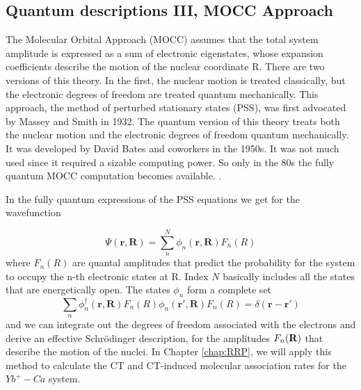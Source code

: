 \subsection{Quantum descriptions III, MOCC Approach}

The Molecular Orbital Approach (MOCC) assumes that the total system amplitude is expressed as a sum of electronic
eigenstates, whose expansion coefficients describe the motion of the nuclear coordinate R. There are two versions of
this theory. In the first, the nuclear motion is treated classically, but the electronic degrees of freedom are treated quantum mechanically. This approach, the method of perturbed stationary states (PSS), was first advocated by Massey and Smith in 1932.
The quantum version of this theory treats both the nuclear motion and the electronic degrees of freedom quantum mechanically. It was developed by David Bates and coworkers in the 1950s. It was not much used since it required a sizable computing power. So only in the 80s the fully quantum MOCC computation becomes available. \cite{ZygelmanCT}.

In the fully quantum expressions of the PSS equations we get for the wavefunction

\begin{equation}
  \Psi(\mathbf{r},\mathbf{R}) = \sum_n^N{\phi_n(\mathbf{r},\mathbf{R})F_n(R)}
\end{equation}
where $ F_n(R) $ are quantal amplitudes that predict the probability for the system to occupy the n-th electronic states
at R. Index $ N $ basically includes all the states that are energetically open.
The states $ \phi_n $ form a complete set
\begin{equation}
  \sum_n{\phi_n^{\dag}(\mathbf{r},\mathbf{R})F_n(R)\phi_n(\mathbf{r'},\mathbf{R})F_n(R)} = \delta(\mathbf{r} - \mathbf{r'})
\end{equation}
and we can integrate out the degrees of freedom associated with the electrons and derive an effective Schrödinger description, for the amplitudes $F_{n}(\bf R)$ that describe the motion of the nuclei. In Chapter \ref{chap:RRP}, we will apply this method to calculate 
the CT and CT-induced molecular association rates for the
$ Yb^{+}-Ca$ system.

